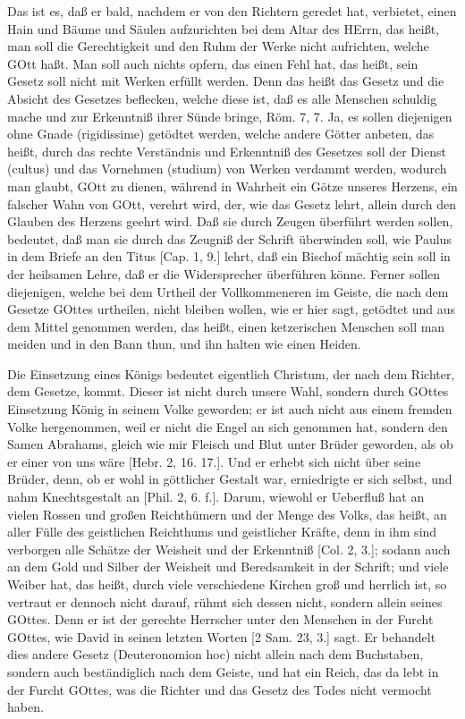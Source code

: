 Das ist es, daß er bald, nachdem er von den Richtern geredet hat, verbietet, einen Hain und Bäume und Säulen aufzurichten bei dem Altar des HErrn, das heißt, man soll die Gerechtigkeit und den Ruhm der Werke nicht aufrichten, welche GOtt haßt. Man soll auch nichts opfern, das einen Fehl hat, das heißt, sein Gesetz soll nicht mit Werken erfüllt werden. Denn das heißt das Gesetz und die Absicht des Gesetzes beflecken, welche diese ist, daß es alle Menschen schuldig mache und zur Erkenntniß ihrer Sünde bringe, Röm. 7, 7. Ja, es sollen diejenigen ohne Gnade (rigidissime) getödtet werden, welche andere
Götter anbeten, das heißt, durch das rechte Verständnis und Erkenntniß des Gesetzes soll der Dienst (cultus) und das Vornehmen (studium) von Werken verdammt werden, wodurch man glaubt, GOtt zu dienen, während in Wahrheit ein Götze unseres Herzens, ein falscher Wahn von GOtt, verehrt wird, der, wie das Gesetz lehrt, allein durch den Glauben des Herzens geehrt wird. Daß sie durch Zeugen überführt werden sollen, bedeutet, daß man sie durch das Zeugniß der Schrift überwinden soll, wie Paulus in dem Briefe an den Titus [Cap. 1, 9.] lehrt, daß ein Bischof mächtig sein soll in der heilsamen Lehre, daß er die Widersprecher überführen könne. Ferner sollen diejenigen, welche bei dem Urtheil der Vollkommeneren im Geiste, die nach dem Gesetze GOttes urtheilen, nicht bleiben wollen, wie er hier sagt, getödtet und aus dem Mittel genommen werden, das heißt, einen ketzerischen Menschen soll man meiden und in den Bann thun, und ihn halten wie einen Heiden.

Die Einsetzung eines Königs bedeutet eigentlich Christum, der nach dem Richter, dem Gesetze, kommt. Dieser ist nicht durch unsere Wahl, sondern durch GOttes Einsetzung König in seinem Volke geworden; er ist auch nicht aus einem fremden Volke hergenommen, weil er nicht die Engel an sich genommen hat, sondern den Samen Abrahams, gleich wie mir Fleisch und Blut unter Brüder geworden, als ob er einer von uns wäre [Hebr. 2, 16. 17.]. Und er erhebt sich nicht über seine Brüder, denn, ob er wohl in göttlicher Gestalt war, erniedrigte er sich selbst, und nahm Knechtsgestalt an [Phil. 2, 6. f.]. Darum, wiewohl er Ueberfluß hat an vielen Rossen und großen Reichthümern und der Menge des Volks, das heißt, an aller Fülle des geistlichen Reichthums und geistlicher Kräfte, denn in ihm sind verborgen alle Schätze der Weisheit und der Erkenntniß [Col. 2, 3.]; sodann auch an dem Gold und Silber der Weisheit und Beredsamkeit in der Schrift; und viele Weiber hat, das heißt, durch viele verschiedene Kirchen groß und herrlich ist, so vertraut er dennoch nicht darauf, rühmt sich dessen nicht, sondern allein seines GOttes. Denn er ist der gerechte Herrscher unter den Menschen in der Furcht GOttes, wie David in seinen letzten Worten [2 Sam. 23, 3.] sagt. Er behandelt dies andere Gesetz (Deuteronomion hoc) nicht allein nach dem Buchstaben, sondern auch beständiglich nach dem Geiste, und hat ein Reich, das da lebt in der Furcht GOttes, was die Richter und das Gesetz des Todes nicht vermocht haben.

